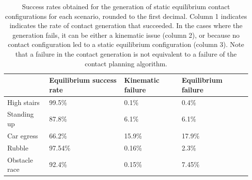 \documentclass[journal]{IEEEtran}
\providecommand{\DIFaddtex}[1]{#1} %
\providecommand{\DIFaddFL}[1]{\DIFadd{#1}} %
\providecommand{\DIFadd}[1]{\texorpdfstring{\DIFaddtex{#1}}{#1}} %
\begin{document}
\begin{table}
\centering
\begin{tabular}{ l | >{\centering\arraybackslash}m{65pt} | >{\centering\arraybackslash}m{35pt} | >{\centering\arraybackslash}m{35pt} | c}
  &  \DIFaddFL{Equilibrium success rate }& \DIFaddFL{Kinematic failure }& \DIFaddFL{Equilibrium failure }\\
 \hline
   \DIFaddFL{High stairs 	}& \DIFaddFL{99.5\%  }& \DIFaddFL{0.1\% 	}& \DIFaddFL{0.4\% }\\
   \DIFaddFL{Standing up 		}& \DIFaddFL{87.8\%  }& \DIFaddFL{6.1\% 	}& \DIFaddFL{6.1\% }\\
   \DIFaddFL{Car egress 		}& \DIFaddFL{66.2\%  }& \DIFaddFL{15.9\% 	}& \DIFaddFL{17.9\% }\\
   \DIFaddFL{Rubble 			}& \DIFaddFL{97.54\% }& \DIFaddFL{0.16\% 	}& \DIFaddFL{2.3\% }\\
   \DIFaddFL{Obstacle race 	}& \DIFaddFL{92.4\%  }& \DIFaddFL{0.15\% 	}& \DIFaddFL{7.45\% }\\
 \end{tabular}
\caption{\DIFaddFL{Success rates obtained for the generation of static equilibrium contact configurations for each scenario, rounded to the first decimal. Column 1 indicates 
indicates the rate of contact generation that succeeded. In the cases where the generation fails, it can be
either a kinematic issue (column 2), or because no contact configuration led to a static equilibrium configuration (column 3). Note that a failure in the contact generation
is not equivalent to a failure of the contact planning algorithm.}}
\label{tab:requestpercent}
\quad
\end{table}
\end{document}
